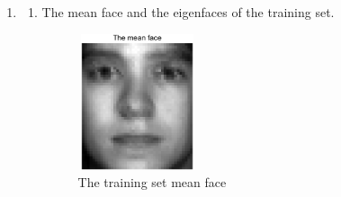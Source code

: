 \documentclass[english,onecolumn]{IEEEtran}
\begin{document}
\begin{enumerate}
	\item
	\begin{enumerate}
		\item The mean face and the eigenfaces of the training set.
	\begin{figure}[h]
		\centering
		\includegraphics[height=4cm,width=3.5cm]{pro4_2_1.png}
		\caption{The training set mean face}
		\label{5}
	\end{figure}
	\newpage
	\begin{figure}[htbp]
		\centering
		\quad
		\quad
		\quad
\end{figure}
\end{enumerate}
\end{enumerate}
\end{document}
